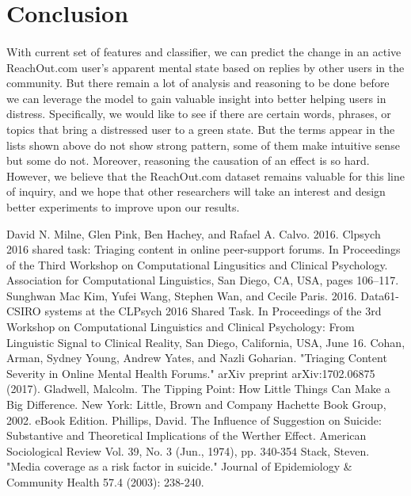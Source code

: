 \documentclass{article}
\begin{document}
\section{Conclusion}

\paragraph{}With current set of features and classifier, we can predict the change in an active ReachOut.com user’s apparent mental state based on replies by other users in the community. But there remain a lot of analysis and reasoning to be done before we can leverage the model to gain valuable insight into better helping users in distress. Specifically, we would like to see if there are certain words, phrases, or topics that bring a distressed user to a green state. But the terms appear in the lists shown above do not show strong pattern, some of them make intuitive sense but some do not. Moreover, reasoning the causation of an effect is so hard. However, we believe that the ReachOut.com dataset remains valuable for this line of inquiry, and we hope that other researchers will take an interest and design better experiments to improve upon our results. 

\begin{thebibliography}{9}

	David N. Milne, Glen Pink, Ben Hachey, and Rafael A. Calvo. 2016. Clpsych 2016 shared task: Triaging content in online peer-support forums. In Proceedings of the Third Workshop on Computational Lingusitics and Clinical Psychology. Association for Computational Linguistics, San Diego, CA, USA, pages 106–117.
	Sunghwan Mac Kim, Yufei Wang, Stephen Wan, and Cecile Paris. 2016. Data61-CSIRO systems at the CLPsych 2016 Shared Task. In Proceedings of the 3rd Workshop on Computational Linguistics and Clinical Psychology: From Linguistic Signal to Clinical Reality, San Diego, California, USA, June 16.
        Cohan, Arman, Sydney Young, Andrew Yates, and Nazli Goharian. "Triaging Content Severity in Online Mental Health Forums." arXiv preprint arXiv:1702.06875 (2017).
        Gladwell, Malcolm. The Tipping Point: How Little Things Can Make a Big Difference. New York: Little, Brown and Company Hachette Book Group, 2002. eBook Edition.
        Phillips, David. The Influence of Suggestion on Suicide: Substantive and Theoretical Implications of the Werther Effect. American Sociological Review Vol. 39, No. 3 (Jun., 1974), pp. 340-354
        Stack, Steven. "Media coverage as a risk factor in suicide." Journal of Epidemiology \& Community Health 57.4 (2003): 238-240.

\end{thebibliography}
\end{document}
